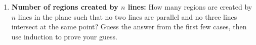 \begin{enumerate}

\item \textbf{Number of regions created by $n$ lines:}
How many regions are created by $n$ lines in the plane such that no two lines
are parallel and no three lines intersect at the same point? Guess the
answer from the first few cases, then use induction to prove your guess. 

%
%
%
%
%
%
%



\end{enumerate}
